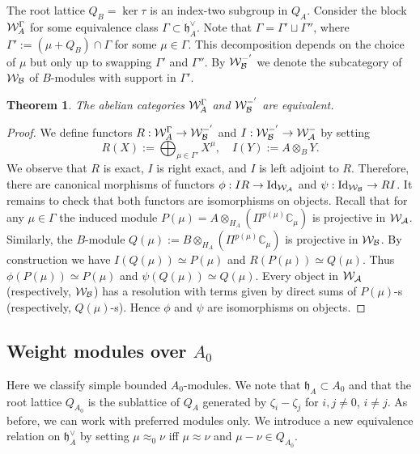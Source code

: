\documentclass[12pt]{amsart}
\def\mathcal{\cal}
\theoremstyle{plain} %
\numberwithin{equation}{section}
\theoremstyle{definition}
\theoremstyle{remark}
\theoremstyle{plain} %
\newtheorem{theorem}[definition]{Theorem}
\newcommand{\cW}{\mathcal{W}}
\newcommand{\C}{\mathbb{C}}
\newcommand{\gh}{\mathfrak{h}}
\def\gh{\mathfrak{h}}
\begin{document}
  The root lattice $Q_{B}=\ker\tau$ is an index-two subgroup in $Q_A$. Consider the block ${\cW}_A^\Gamma$ for some equivalence
  class $\Gamma\subset \gh^\vee_A$. Note that $\Gamma=\Gamma'\sqcup \Gamma''$, where
  $\Gamma':=(\mu+Q_{B})\cap\Gamma$ for some $\mu\in\Gamma$. This decomposition depends on the choice of $\mu$ but only up to swapping $\Gamma'$ and
  $\Gamma''$. By $\cW_{B}^{\Gamma'}$ we denote the subcategory of $\cW_{B}$ of $B$-modules with support in $\Gamma'$.

  \begin{theorem}\label{even} The abelian categories  ${\cW}_A^\Gamma$ and $\cW_{B}^{\Gamma'}$ are equivalent.
  \end{theorem}
  \begin{proof} We define functors $R:{\cW}_A^\Gamma \to \cW_{B}^{\Gamma'}$ and $I:\cW_{B}^{\Gamma'}\to{\cW}_A^\Gamma$ by setting
    $$R(X):=\bigoplus_{\mu\in\Gamma'} X^\mu,\quad I(Y):=A\otimes_{B}Y.$$
    We observe that $R$ is exact,  $I$ is right exact, and $I$ is left adjoint to $R$. Therefore, there are  canonical morphisms of functors $\phi:IR\to \operatorname{Id}_{\cW_{A}}$ and $\psi:\operatorname{Id}_{\cW_{B}}\to RI$.
    It remains to check that both functors are isomorphisms on objects. Recall that for any $\mu\in \Gamma$ the induced module $P(\mu)=A\otimes_{H_A} \left( \Pi^{p(\mu)} \C_{\mu} \right)$ is projective in $\cW_A$. Similarly, the $B$-module
    $Q(\mu):=B\otimes_{H_A} \left( \Pi^{p(\mu)} \C_{\mu} \right)$ is projective in $\cW_{B}$. By construction we have $I(Q(\mu))\simeq P(\mu)$ and $R(P(\mu))\simeq Q(\mu)$. Thus $\phi(P(\mu))\simeq P(\mu)$ and $\psi(Q(\mu))\simeq Q(\mu)$.
   Every object in $\cW_A$ (respectively, $\cW_B$) has a resolution with terms given by direct sums of $P(\mu)$-s (respectively, $Q(\mu)$-s). Hence $\phi$ and $\psi$ are isomorphisms on  objects.
         \end{proof}

    \subsection{Weight modules over $A_0$} Here we classify simple bounded $A_0$-modules. 
    We note that  $\gh_A\subset A_0$ and that the root lattice $Q_{A_0}$ is the sublattice of $Q_A$ generated by $\zeta_i-\zeta_j$ for  $i,j\neq 0$, $i \neq j$.  As before, we can work with preferred modules only.
    We introduce a new equivalence relation on $\gh_A^\vee$ by setting $\mu\approx_{0}\nu$
    iff $\mu\approx\nu$ and $\mu-\nu\in Q_{A_0}$.
\end{document}
